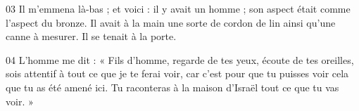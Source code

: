 
03 Il m’emmena là-bas ; et voici : il y avait un homme ; son aspect était comme l’aspect du bronze. Il avait à la main une sorte de cordon de lin ainsi qu’une canne à mesurer. Il se tenait à la porte.

04 L’homme me dit : « Fils d’homme, regarde de tes yeux, écoute de tes oreilles, sois attentif à tout ce que je te ferai voir, car c’est pour que tu puisses voir cela que tu as été amené ici. Tu raconteras à la maison d’Israël tout ce que tu vas voir. »
